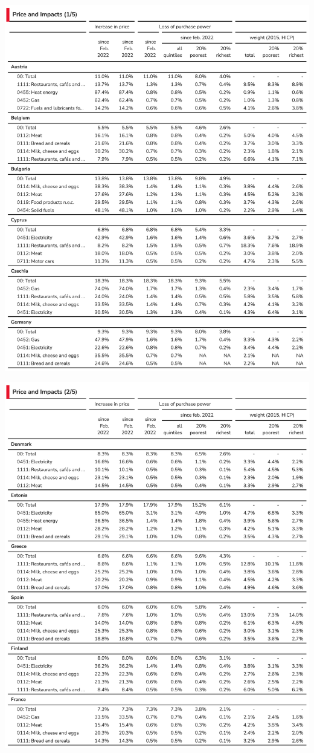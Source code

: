 \documentclass[
  9pt,
  a4paper,
  numbers=noendperiod,
  DIV=12]{scrartcl}
\begin{document}
\includegraphics{svg/annex_1.png}

\includegraphics{svg/annex_2.png}
\end{document}
